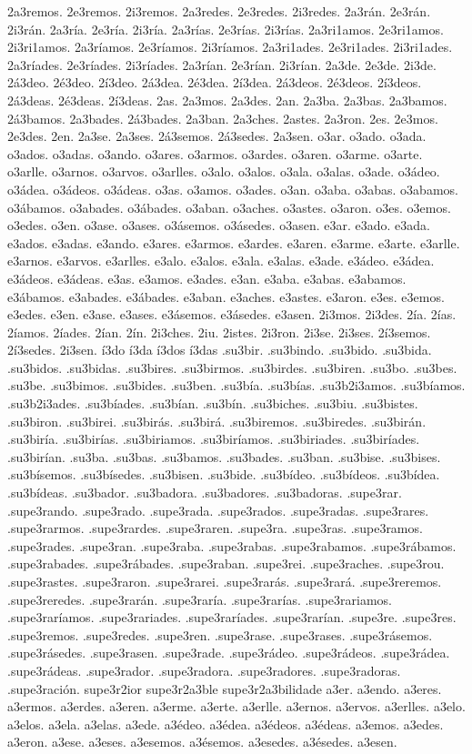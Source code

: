 {2a3remos. 2e3remos. 2i3remos.
2a3redes. 2e3redes. 2i3redes.
2a3rán. 2e3rán. 2i3rán.
%
2a3ría. 2e3ría. 2i3ría.
2a3rías. 2e3rías. 2i3rías.
2a3ri1amos. 2e3ri1amos. 2i3ri1amos.
2a3ríamos. 2e3ríamos. 2i3ríamos.
2a3ri1ades. 2e3ri1ades. 2i3ri1ades.
2a3ríades. 2e3ríades. 2i3ríades.
2a3rían. 2e3rían. 2i3rían.
%
2a3de. 2e3de. 2i3de.
%
2á3deo. 2é3deo. 2í3deo.
2á3dea. 2é3dea. 2í3dea.
2á3deos. 2é3deos. 2í3deos.
2á3deas. 2é3deas. 2í3deas.
%
2as. 2a3mos. 2a3des. 2an.
2a3ba. 2a3bas. 2a3bamos. 2á3bamos. 2a3bades. 2á3bades. 2a3ban.
2a3ches. 2astes. 2a3ron.
2es. 2e3mos. 2e3des. 2en.
2a3se. 2a3ses. 2á3semos. 2á3sedes. 2a3sen.
%
o3ar. o3ado. o3ada. o3ados. o3adas. o3ando.
o3ares. o3armos. o3ardes. o3aren.
o3arme. o3arte. o3arlle. o3arnos. o3arvos. o3arlles.
o3alo. o3alos. o3ala. o3alas.
o3ade. o3ádeo. o3ádea. o3ádeos. o3ádeas.
o3as. o3amos. o3ades. o3an.
o3aba. o3abas. o3abamos. o3ábamos. o3abades. o3ábades. o3aban.
o3aches. o3astes. o3aron.
o3es. o3emos. o3edes. o3en.
o3ase. o3ases. o3ásemos. o3ásedes. o3asen.
%
e3ar. e3ado. e3ada. e3ados. e3adas. e3ando.
e3ares. e3armos. e3ardes. e3aren.
e3arme. e3arte. e3arlle. e3arnos. e3arvos. e3arlles.
e3alo. e3alos. e3ala. e3alas.
e3ade. e3ádeo. e3ádea. e3ádeos. e3ádeas.
e3as. e3amos. e3ades. e3an.
e3aba. e3abas. e3abamos. e3ábamos. e3abades. e3ábades. e3aban.
e3aches. e3astes. e3aron.
e3es. e3emos. e3edes. e3en.
e3ase. e3ases. e3ásemos. e3ásedes. e3asen.
%
2i3mos. 2i3des.
2ía. 2ías. 2íamos. 2íades. 2ían.
2ín. 2i3ches. 2iu. 2istes. 2i3ron.
2i3se. 2i3ses. 2í3semos. 2í3sedes. 2i3sen.
%
í3do í3da í3dos í3das
%
.su3bir. .su3bindo. .su3bido. .su3bida. .su3bidos. .su3bidas.
.su3bires. .su3birmos. .su3birdes. .su3biren.
.su3bo. .su3bes. .su3be. .su3bimos. .su3bides. .su3ben.
.su3bía. .su3bías. .su3b2i3amos. .su3bíamos. .su3b2i3ades. .su3bíades. .su3bían.
.su3bín. .su3biches. .su3biu. .su3bistes. .su3biron.
.su3birei. .su3birás. .su3birá. .su3biremos. .su3biredes. .su3birán.
.su3biría. .su3birías. .su3biriamos. .su3biríamos. .su3biriades. .su3biríades. .su3birían.
.su3ba. .su3bas. .su3bamos. .su3bades. .su3ban.
.su3bise. .su3bises. .su3bísemos. .su3bísedes. .su3bisen.
.su3bide. .su3bídeo. .su3bídeos. .su3bídea. .su3bídeas.
.su3bador. .su3badora. .su3badores. .su3badoras.
%
.supe3rar. .supe3rando. .supe3rado. .supe3rada. .supe3rados. .supe3radas.
.supe3rares. .supe3rarmos. .supe3rardes. .supe3raren.
.supe3ra. .supe3ras. .supe3ramos. .supe3rades. .supe3ran.
.supe3raba. .supe3rabas. .supe3rabamos. .supe3rábamos. .supe3rabades. .supe3rábades. .supe3raban.
.supe3rei. .supe3raches. .supe3rou. .supe3rastes. .supe3raron.
.supe3rarei. .supe3rarás. .supe3rará. .supe3reremos. .supe3reredes. .supe3rarán.
.supe3raría. .supe3rarías. .supe3rariamos. .supe3raríamos. .supe3rariades. .supe3raríades. .supe3rarían.
.supe3re. .supe3res. .supe3remos. .supe3redes. .supe3ren.
.supe3rase. .supe3rases. .supe3rásemos. .supe3rásedes. .supe3rasen.
.supe3rade. .supe3rádeo. .supe3rádeos. .supe3rádea. .supe3rádeas.
.supe3rador. .supe3radora. .supe3radores. .supe3radoras. .supe3ración.
supe3r2ior supe3r2a3ble supe3r2a3bilidade
%
a3er. a3endo.
a3eres. a3ermos. a3erdes. a3eren.
a3erme. a3erte. a3erlle. a3ernos. a3ervos. a3erlles.
a3elo. a3elos. a3ela. a3elas.
a3ede. a3édeo. a3édea. a3édeos. a3édeas.
a3emos. a3edes. a3eron.
a3ese. a3eses. a3esemos. a3ésemos. a3esedes. a3ésedes. a3esen.
}
